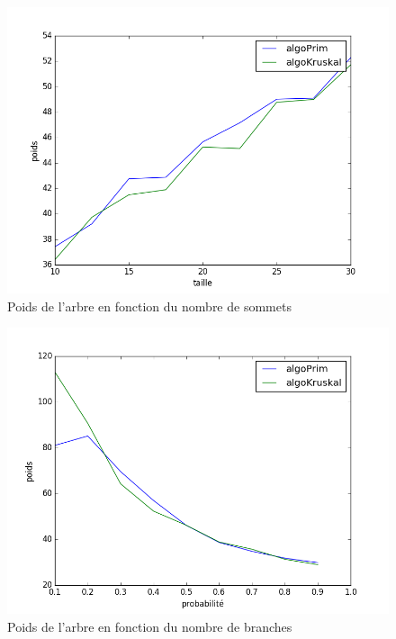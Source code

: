\documentclass[a4paper,10pt]{report}
\begin{document}
\begin{center}
  \begin{figure}[ht]
    \label{color}
    \includegraphics[scale=0.5]{poids(taille).png}
    \caption{Poids de l'arbre en fonction du nombre de sommets}
  \end{figure} 
\end{center}

\begin{center}
  \begin{figure}[ht]
    \label{color}
    \includegraphics[scale=0.5]{poids(probabilite).png}
    \caption{Poids de l'arbre en fonction du nombre de branches}
  \end{figure} 
\end{center}
\end{document}

